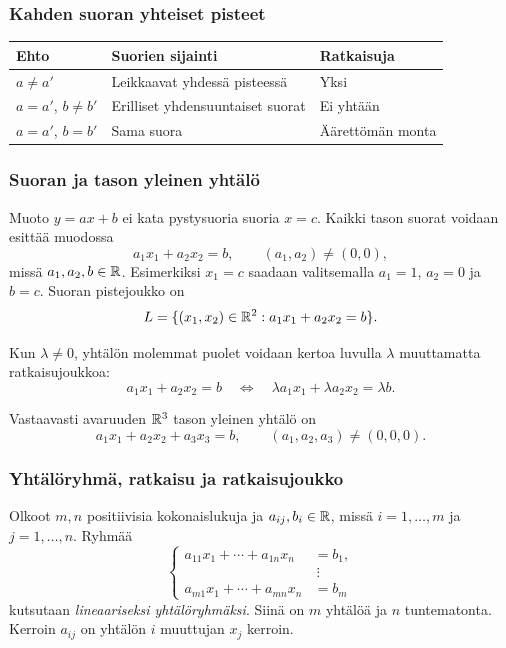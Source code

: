 \documentclass[11pt,a4paper]{amsart}
\begin{document}
\subsubsection*{Kahden suoran yhteiset pisteet}
\begin{center}
  \renewcommand{\arraystretch}{1.35}
  \begin{tabular}{lll}
    \hline
    Ehto & Suorien sijainti & Ratkaisuja\\
    \hline
    $a\ne a'$ & Leikkaavat yhdessä pisteessä & Yksi\\
    $a=a'$, $b\ne b'$ & Erilliset yhdensuuntaiset suorat & Ei yhtään\\
    $a=a'$, $b=b'$ & Sama suora & Äärettömän monta\\
    \hline
  \end{tabular}
\end{center}

\subsubsection*{Suoran ja tason yleinen yhtälö}

Muoto $y=ax+b$ ei kata pystysuoria suoria $x=c$. Kaikki tason suorat
voidaan esittää muodossa
\[
  \boxed{a_1x_1+a_2x_2=b,\qquad (a_1,a_2)\ne(0,0),}
\]
missä $a_1,a_2,b\in\mathbb{R}$. Esimerkiksi $x_1=c$ saadaan valitsemalla
$a_1=1$, $a_2=0$ ja $b=c$. Suoran pistejoukko on
\[
  L=\{(x_1,x_2)\in\mathbb{R}^2:a_1x_1+a_2x_2=b\}.
\]

\begin{remark}
  Kun $\lambda\ne0$, yhtälön molemmat puolet voidaan kertoa luvulla
  $\lambda$ muuttamatta ratkaisujoukkoa:
  \[
    a_1x_1+a_2x_2=b
    \quad\Longleftrightarrow\quad
    \lambda a_1x_1+\lambda a_2x_2=\lambda b.
  \]
\end{remark}

Vastaavasti avaruuden $\mathbb{R}^3$ tason yleinen yhtälö on
\[
  a_1x_1+a_2x_2+a_3x_3=b,
  \qquad (a_1,a_2,a_3)\ne(0,0,0).
\]

\subsubsection*{Yhtälöryhmä, ratkaisu ja ratkaisujoukko}

\begin{definition}
  Olkoot $m,n$ positiivisia kokonaislukuja ja
  $a_{ij},b_i\in\mathbb{R}$, missä $i=1,\ldots,m$ ja $j=1,\ldots,n$.
  Ryhmää
  \begin{equation}\label{eq:linear-system}
    \left\{
      \begin{aligned}
        a_{11}x_1+\cdots+a_{1n}x_n&=b_1,\\
        &\ \vdots\\
        a_{m1}x_1+\cdots+a_{mn}x_n&=b_m
      \end{aligned}\right.
      \tag{YR}
    \end{equation}
    kutsutaan \emph{lineaariseksi yhtälöryhmäksi}.
    Siinä on $m$ yhtälöä ja $n$ tuntematonta.
    Kerroin $a_{ij}$ on yhtälön $i$ muuttujan $x_j$ kerroin.
  \end{definition}
\end{document}
